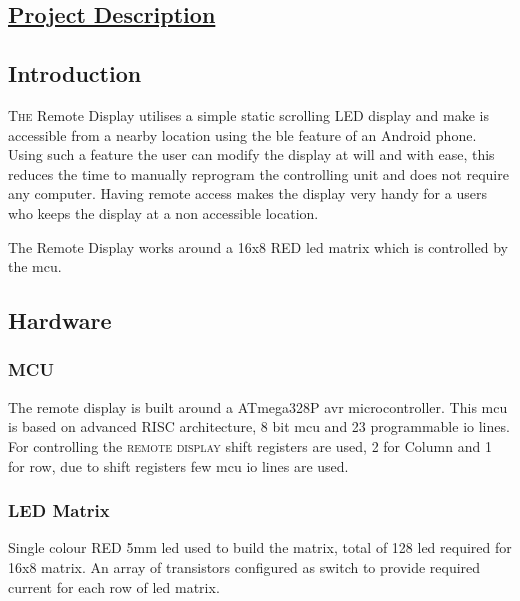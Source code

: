 \vspace*{8.5cm}

\begin{minipage}{1.0\textwidth}

\begin{flushright}
	\section{\huge{\underline{Project Description}}}
\end{flushright}
\end{minipage}

\begin{multicols}{2}

		\subsection{Introduction}

			\lettrine{T}{he} Remote Display utilises a simple static scrolling LED display and make is accessible from a nearby location using the \gls{ble} feature of an Android phone. Using such a feature the user can modify the display at will and with ease, this reduces the time to manually reprogram the controlling unit and does not require any computer. Having remote access makes the display very handy for a users who keeps the display at a non accessible location. 
			
			The Remote Display works around a 16x8 RED \gls{led} matrix which is controlled by the \gls{mcu}.
			
		\subsection{Hardware}
			\subsubsection{MCU}
				The remote display is built around a ATmega328P \gls{avr} microcontroller. This \gls{mcu} is based on advanced RISC \cite{AtMega328P} architecture, 8 bit \gls{mcu} and 23 programmable \gls{io} lines. For controlling the \textsc{remote display} shift registers are used, 2 for Column and 1 for row, due to shift registers few \gls{mcu} \gls{io} lines are used.
			\subsubsection{LED Matrix}
				 Single colour  RED 5mm \gls{led} used to build the matrix, total of 128 \gls{led} required for 16x8 matrix. An array of transistors configured as switch to provide required current for each row of \gls{led} matrix.  


\end{multicols}
